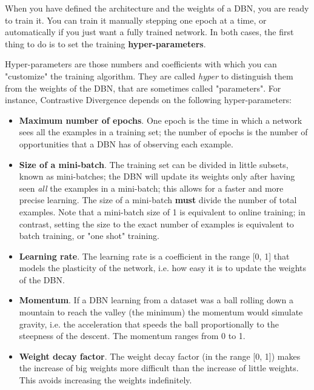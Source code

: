 \documentclass[a4paper]{article}
\begin{document}
		
When you have defined the architecture and the weights of a DBN, you are ready to train it. You can train it manually stepping one epoch at a time, or automatically if you just want a fully trained network. In both cases, the first thing to do is to set the training \textbf{hyper-parameters}.
		
Hyper-parameters are those numbers and coefficients with which you can "customize" the training algorithm. They are called \emph{hyper} to distinguish them from the weights of the DBN, that are sometimes called "parameters". For instance, Contrastive Divergence depends on the following hyper-parameters:
		
	\begin{itemize}
		
			
	\item \textbf{Maximum number of epochs}. One epoch is the time in which a network sees all the examples in a training set; the number of epochs is the number of opportunities that a DBN has of observing each example.
			
	\item \textbf{Size of a mini-batch}. The training set can be divided in little subsets, known as mini-batches; the DBN will update its weights only after having seen \emph{all} the examples in a mini-batch; this allows for a faster and more precise learning. The size of a mini-batch \textbf{must} divide the number of total examples. Note that a mini-batch size of 1 is equivalent to online training; in contrast, setting the size to the exact number of examples is equivalent to batch training, or "one shot" training.
			
	\item \textbf{Learning rate}. The learning rate is a coefficient in the range [0, 1] that models the plasticity of the network, i.e. how easy it is to update the weights of the DBN.
			
	\item \textbf{Momentum}. If a DBN learning from a dataset was a ball rolling down a mountain to reach the valley (the minimum) the momentum would simulate gravity, i.e. the acceleration that speeds the ball proportionally to the steepness of the descent. The momentum ranges from 0 to 1.
			
	\item \textbf{Weight decay factor}. The weight decay factor (in the range [0, 1]) makes the increase of big weights more difficult than the increase of little weights. This avoids increasing the weights indefinitely.
			

\end{itemize}
\end{document}
